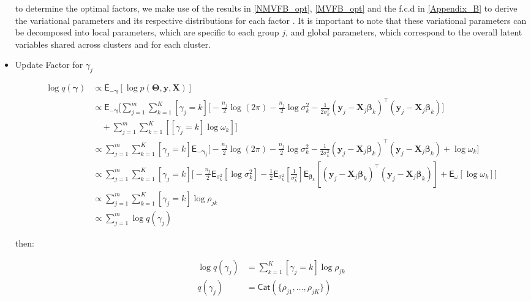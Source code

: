 \begin{appendix}
\begin{itemize}
to determine the optimal factors, we make use of the results in \ref{NMVFB_opt}, \ref{MVFB_opt} and the f.c.d in \ref{Appendix_B} to derive the variational parameters  and its respective distributions for each factor . It is important to note that these variational parameters can be decomposed into local parameters, which are specific to each group $j$, and global parameters, which correspond to the overall latent variables shared across clusters and for each cluster.

\newpage

\item Update Factor for $\gamma_j$

\begin{equation}
\begin{split}
\log q(\bm{\gamma})
&\propto\mathsf{E}_{-\bm{\gamma}}\left[\log p(\bm{\Theta},\bm{y}, \bm{X})\right]\\
&\propto\mathsf{E}_{-\bm{\gamma}}\Bigg[\sum_{j=1}^{m}\sum_{k=1}^{K} [\gamma_j=k]\Bigg[
-\tfrac{n_j}{2}\log(2\pi)-\tfrac{n_j}{2}\log\sigma^2_{k}
-\tfrac{1}{2\sigma^2_{k}}\left(\bm{y}_{j}-\bm{X}_{j}\bm{\beta}_{k}\right)^\top\left(\bm{y}_{j}-\bm{X}_{j}\bm{\beta}_{k}\right)
\Bigg] \\
&\quad + \sum_{j=1}^{m}\sum_{k=1}^{K}\left[[\gamma_j=k]\log\omega_k\right]\Bigg]\\
&\propto\sum_{j=1}^{m}\sum_{k=1}^{K}[\gamma_j=k]\mathsf{E}_{-\bm{\gamma}_j}\Bigg[
-\tfrac{n_j}{2}\log(2\pi)-\tfrac{n_j}{2}\log\sigma^2_{k}
-\tfrac{1}{2\sigma^2_{k}}\left(\bm{y}_{j}-\bm{X}_{j}\bm{\beta}_{k}\right)^\top\left(\bm{y}_{j}-\bm{X}_{j}\bm{\beta}_{k}\right)+\log\omega_k
\Bigg] \\
&\propto\sum_{j=1}^{m}\sum_{k=1}^{K}[\gamma_j=k]\Bigg[
-\tfrac{n_j}{2}\mathsf{E}_{\sigma^2_k}\left[\log\sigma^2_{k}\right]
-\tfrac{1}{2}\mathsf{E}_{\sigma^2_k}\left[\frac{1}{\sigma^2_{k}}\right]\mathsf{E}_{\bm{\beta}_k}\left[\left(\bm{y}_{j}-\bm{X}_{j}\bm{\beta}_{k}\right)^\top\left(\bm{y}_{j}-\bm{X}_{j}\bm{\beta}_{k}\right)\right]+\mathsf{E}_{\omega}\left[\log\omega_k\right]
\Bigg] \\
&\propto\sum_{j=1}^{m}\sum_{k=1}^{K}[\gamma_j=k]\log\rho_{jk} \\
&\propto\sum_{j=1}^{m}\log q(\gamma_j)
\end{split}
\end{equation}

then:

\begin{equation}
\begin{split}
\log q(\gamma_j)&=\sum_{k=1}^{K}[\gamma_j=k]\log\rho_{jk}\\
q(\gamma_j)&=\mathsf{Cat}(\lbrace{\rho_{j1},\dots,\rho_{jK}\rbrace})
\end{split}
\end{equation}


\end{itemize}
\end{appendix}
